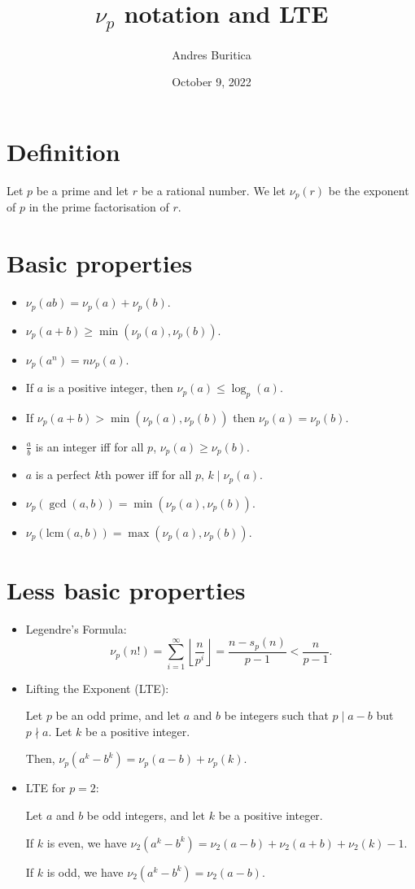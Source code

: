 \documentclass{article}
\title{$\nu_p$ notation and LTE}
\author{Andres Buritica}
\date{October 9, 2022}
\newcommand\lcm{\mathrm{lcm}}
\begin{document}
\maketitle
\section{Definition}
  Let $p$ be a prime and let $r$ be a rational number. We let $\nu_p(r)$ be the
  exponent of $p$ in the prime factorisation of $r$.
\section{Basic properties}
\begin{itemize}
  \item $\nu_p(ab)=\nu_p(a)+\nu_p(b)$.
  \item $\nu_p(a+b)\ge\min(\nu_p(a),\nu_p(b))$.
  \item $\nu_p(a^n)=n\nu_p(a)$.
  \item If $a$ is a positive integer, then $\nu_p(a)\le\log_p(a)$.
  \item If $\nu_p(a+b)>\min(\nu_p(a),\nu_p(b))$ then $\nu_p(a)=\nu_p(b)$.
  \item $\frac ab$ is an integer iff for all $p$, $\nu_p(a)\ge\nu_p(b)$.
  \item $a$ is a perfect $k$th power iff for all $p$, $k\mid\nu_p(a)$.
  \item $\nu_p(\gcd(a,b))=\min(\nu_p(a),\nu_p(b))$.
  \item $\nu_p(\lcm(a,b))=\max(\nu_p(a),\nu_p(b))$.
\end{itemize}
\section{Less basic properties}
\begin{itemize}
  \item Legendre's Formula:
    \[\nu_p(n!)=\sum_{i=1}^\infty\left\lfloor\frac
      n{p^i}\right\rfloor=\frac{n-s_p(n)}{p-1}<\frac
    n{p-1}.\]
  \item Lifting the Exponent (LTE):

    Let $p$ be an odd prime, and let $a$ and $b$ be integers such that $p\mid
    a-b$ but $p\nmid a$. Let $k$ be a positive integer.

    Then, $\nu_p\left(a^k-b^k\right)=\nu_p(a-b)+\nu_p(k)$.
  \item LTE for $p=2$:

    Let $a$ and $b$ be odd integers, and let $k$ be a positive integer.

    If $k$ is even, we have $\nu_2(a^k-b^k)=\nu_2(a-b)+\nu_2(a+b)+\nu_2(k)-1$.

    If $k$ is odd, we have $\nu_2(a^k-b^k)=\nu_2(a-b)$.
\end{itemize}
\end{document}
